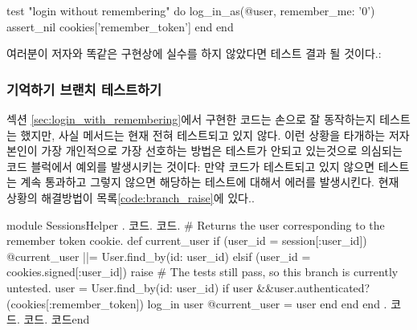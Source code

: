{{\begin{codelisting}
\begin{code}
test "login without remembering" do log_in_as(@user, remember_me: '0') assert_nil cookies['remember_token'] end end \end{code} \end{codelisting} 

\noindent 여러분이 저자와 똑같은 구현상에 실수를 하지 않았다면 테스트 결과  될 것이다.: 

\begin{codelisting}  

 \end{codelisting} 

\subsubsection{기억하기 브랜치 테스트하기} \label{sec:testing_the_remember_branch} 

섹션 \ref{sec:login_with_remembering}에서 구현한 코드는 손으로 잘 동작하는지 테스트는 했지만,  사실  메서드는 현재 전혀 테스트되고 있지 않다. 이런 상황을 타개하는 저자 본인이 가장 개인적으로 가장 선호하는 방법은 테스트가 안되고 있는것으로 의심되는 코드 블럭에서 예외를 발생시키는 것이다: 만약 코드가 테스트되고 있지 않으면 테스트는 계속 통과하고 그렇지 않으면 해당하는 테스트에 대해서 에러를 발생시킨다. 현재 상황의 해결방법이 목록\ref{code:branch_raise}에 있다.. 

\begin{codelisting} \label{code:branch_raise}  

\begin{code} module SessionsHelper . 코드. 코드. # Returns the user corresponding to the remember token cookie. def current_user if (user_id = session[:user_id]) @current_user ||= User.find_by(id: user_id) elsif (user_id = cookies.signed[:user_id]) raise # The tests still pass, so this branch is currently untested. user = User.find_by(id: user_id) if user &&user.authenticated?(cookies[:remember_token]) log_in user @current_user = user end end end . 코드. 코드. 코드end \end{code} \end{codelisting} 

}}
